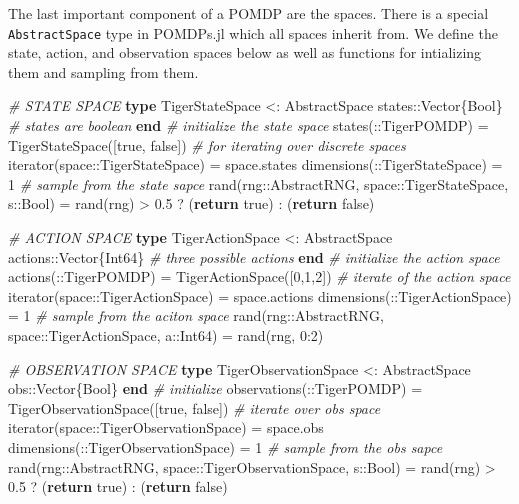 \documentclass[12pt,]{article}
\newenvironment{Shaded}{}{}
\newcommand{\KeywordTok}[1]{\textcolor[rgb]{0.00,0.44,0.13}{\textbf{{#1}}}}
\newcommand{\DataTypeTok}[1]{\textcolor[rgb]{0.56,0.13,0.00}{{#1}}}
\newcommand{\FloatTok}[1]{\textcolor[rgb]{0.25,0.63,0.44}{{#1}}}
\newcommand{\CommentTok}[1]{\textcolor[rgb]{0.38,0.63,0.69}{\textit{{#1}}}}
\newcommand{\NormalTok}[1]{{#1}}
\begin{document}
The last important component of a POMDP are the spaces. There is a
special \texttt{AbstractSpace} type in POMDPs.jl which all spaces
inherit from. We define the state, action, and observation spaces below
as well as functions for intializing them and sampling from them.

\begin{Shaded}
\begin{Highlighting}[]
\CommentTok{# STATE SPACE}
\KeywordTok{type} \NormalTok{TigerStateSpace <: AbstractSpace}
    \NormalTok{states::}\DataTypeTok{Vector}\NormalTok{\{}\DataTypeTok{Bool}\NormalTok{\} }\CommentTok{# states are boolean}
\KeywordTok{end}
\CommentTok{# initialize the state space}
\NormalTok{states(::TigerPOMDP) = TigerStateSpace([true, false])}
\CommentTok{# for iterating over discrete spaces}
\NormalTok{iterator(space::TigerStateSpace) = space.states}
\NormalTok{dimensions(::TigerStateSpace) = }\FloatTok{1}
\CommentTok{# sample from the state sapce}
\NormalTok{rand(rng::AbstractRNG, space::TigerStateSpace, s::}\DataTypeTok{Bool}\NormalTok{) =}
                                \NormalTok{rand(rng) > }\FloatTok{0.5} \NormalTok{? (}\KeywordTok{return} \NormalTok{true) : (}\KeywordTok{return} \NormalTok{false)}

\CommentTok{# ACTION SPACE}
\KeywordTok{type} \NormalTok{TigerActionSpace <: AbstractSpace}
    \NormalTok{actions::}\DataTypeTok{Vector}\NormalTok{\{}\DataTypeTok{Int64}\NormalTok{\} }\CommentTok{# three possible actions}
\KeywordTok{end}
\CommentTok{# initialize the action space}
\NormalTok{actions(::TigerPOMDP) = TigerActionSpace([}\FloatTok{0}\NormalTok{,}\FloatTok{1}\NormalTok{,}\FloatTok{2}\NormalTok{])}
\CommentTok{# iterate of the action space}
\NormalTok{iterator(space::TigerActionSpace) = space.actions}
\NormalTok{dimensions(::TigerActionSpace) = }\FloatTok{1}
\CommentTok{# sample from the aciton space}
\NormalTok{rand(rng::AbstractRNG, space::TigerActionSpace, a::}\DataTypeTok{Int64}\NormalTok{) = rand(rng, }\FloatTok{0}\NormalTok{:}\FloatTok{2}\NormalTok{)}

\CommentTok{# OBSERVATION SPACE}
\KeywordTok{type} \NormalTok{TigerObservationSpace <: AbstractSpace}
    \NormalTok{obs::}\DataTypeTok{Vector}\NormalTok{\{}\DataTypeTok{Bool}\NormalTok{\}}
\KeywordTok{end}
\CommentTok{# initialize}
\NormalTok{observations(::TigerPOMDP) = TigerObservationSpace([true, false])}
\CommentTok{# iterate over obs space}
\NormalTok{iterator(space::TigerObservationSpace) = space.obs}
\NormalTok{dimensions(::TigerObservationSpace) = }\FloatTok{1}
\CommentTok{# sample from the obs sapce}
\NormalTok{rand(rng::AbstractRNG, space::TigerObservationSpace, s::}\DataTypeTok{Bool}\NormalTok{) =}
                                    \NormalTok{rand(rng) > }\FloatTok{0.5} \NormalTok{? (}\KeywordTok{return} \NormalTok{true) : (}\KeywordTok{return} \NormalTok{false)}
\end{Highlighting}
\end{Shaded}
\end{document}
